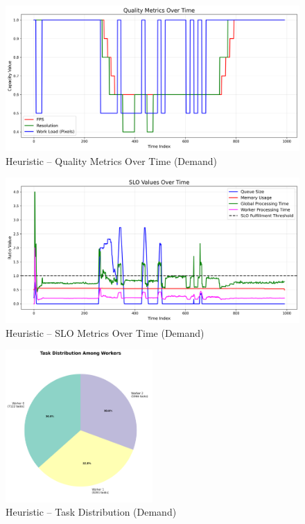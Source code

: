 \begin{figure}[h]
    \centering
    \includegraphics[width=\textwidth]{img/results/variable_computational_demand_sim/heuristic_quality_metrics.png}
    \caption{Heuristic – Quality Metrics Over Time (Demand)}
\end{figure}
\begin{figure}[h]
    \centering
    \includegraphics[width=\textwidth]{img/results/variable_computational_demand_sim/heuristic_slo_values.png}
    \caption{Heuristic – SLO Metrics Over Time (Demand)}
\end{figure}
\begin{figure}[h]
    \centering
    \includegraphics[width=0.5\textwidth]{img/results/variable_computational_demand_sim/heuristic_task_distribution_pie.png}
    \caption{Heuristic – Task Distribution (Demand)}
\end{figure}

